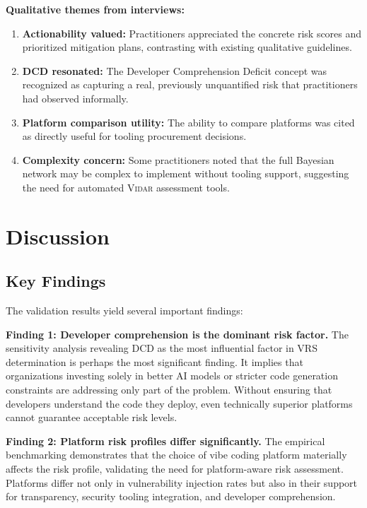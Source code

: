 \documentclass[preprint,review,12pt]{elsarticle}
\newcommand{\vidar}{\textsc{Vidar}}
\begin{document}
\textbf{Qualitative themes from interviews:}
\begin{enumerate}
    \item \textbf{Actionability valued:} Practitioners appreciated the concrete risk scores and prioritized mitigation plans, contrasting with existing qualitative guidelines.
    \item \textbf{DCD resonated:} The Developer Comprehension Deficit concept was recognized as capturing a real, previously unquantified risk that practitioners had observed informally.
    \item \textbf{Platform comparison utility:} The ability to compare platforms was cited as directly useful for tooling procurement decisions.
    \item \textbf{Complexity concern:} Some practitioners noted that the full Bayesian network may be complex to implement without tooling support, suggesting the need for automated \vidar{} assessment tools.
\end{enumerate}


\section{Discussion}
\label{sec:discussion}

\subsection{Key Findings}
\label{subsec:findings}

The validation results yield several important findings:

\textbf{Finding 1: Developer comprehension is the dominant risk factor.} The sensitivity analysis revealing DCD as the most influential factor in VRS determination is perhaps the most significant finding. It implies that organizations investing solely in better AI models or stricter code generation constraints are addressing only part of the problem. Without ensuring that developers understand the code they deploy, even technically superior platforms cannot guarantee acceptable risk levels.

\textbf{Finding 2: Platform risk profiles differ significantly.} The empirical benchmarking demonstrates that the choice of vibe coding platform materially affects the risk profile, validating the need for platform-aware risk assessment. Platforms differ not only in vulnerability injection rates but also in their support for transparency, security tooling integration, and developer comprehension.
\end{document}
